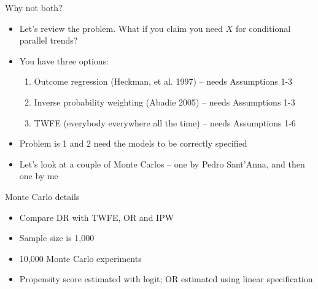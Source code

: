 \documentclass{beamer}
\begin{document}
\begin{frame}{Why not both?}

\begin{itemize}
\item Let's review the problem.  What if you claim you need $X$ for conditional parallel trends?
\item You have three options:
	\begin{enumerate}
	\item Outcome regression (Heckman, et al. 1997) -- needs Assumptions 1-3
	\item Inverse probability weighting (Abadie 2005) -- needs Assumptions 1-3
	\item TWFE (everybody everywhere all the time) -- needs Assumptions 1-6
	\end{enumerate}
\item Problem is 1 and 2 need the models to be correctly specified
\item Let's look at a couple of Monte Carlos -- one by Pedro Sant'Anna, and then one by me
\end{itemize}

\end{frame}




\begin{frame}{Monte Carlo details}

\begin{itemize}
\item Compare DR with TWFE, OR and IPW
\item Sample size is 1,000
\item 10,000 Monte Carlo experiments
\item Propensity score estimated with logit; OR estimated using linear specification
\end{itemize}

\end{frame}
\end{document}
